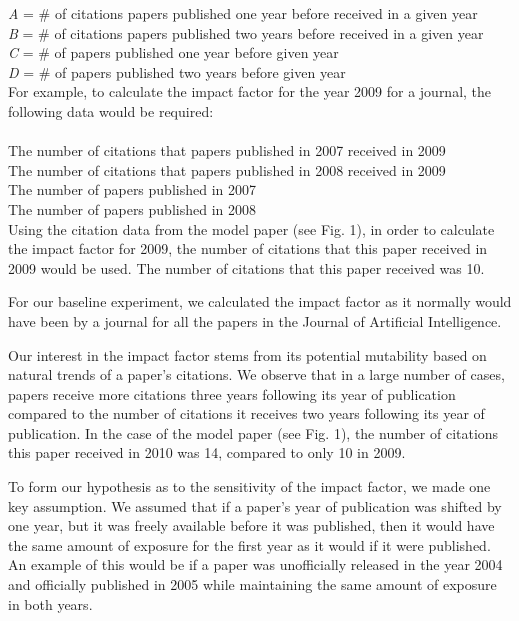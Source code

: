 \documentclass[jair,twoside,11pt,theapa]{article}
\begin{document}
\noindent
\textit{A} = \# of citations papers published one year before received in a given year
\\ \textit{B} = \# of citations papers published two years before received in a given year
\\ \textit{C} = \# of papers published one year before given year 
\\ \textit{D} = \# of papers published two years before given year \\ 

For example, to calculate the impact factor for the year 2009 for a journal, the following data would be required:
\\
\\The number of citations that papers published in 2007 received in 2009 
\\The number of citations that papers published in 2008 received in 2009 
\\The number of papers published in 2007
\\The number of papers published in 2008 \\

Using the citation data from the model paper (see Fig. 1), in order to calculate the impact factor for 2009, the number of citations that this paper received in 2009 would be used. The number of citations that this paper received was 10. 

For our baseline experiment, we calculated the impact factor as it normally would have been by a journal for all the papers in the Journal of Artificial Intelligence. 

Our interest in the impact factor stems from its potential mutability based on natural trends of a paper's citations. We observe that in a large number of cases, papers receive more citations three years following its year of publication compared to the number of citations it receives two years following its year of publication. In the case of the model paper (see Fig. 1), the number of citations this paper received in 2010 was 14, compared to only 10 in 2009. 

To form our hypothesis as to the sensitivity of the impact factor, we made one key assumption. We assumed that if a paper's year of publication was shifted by one year, but it was freely available before it was published, then it would have the same amount of exposure for the first year as it would if it were published. An example of this would be if a paper was unofficially released in the year 2004 and officially published in 2005 while maintaining the same amount of exposure in both years. 
\end{document}
